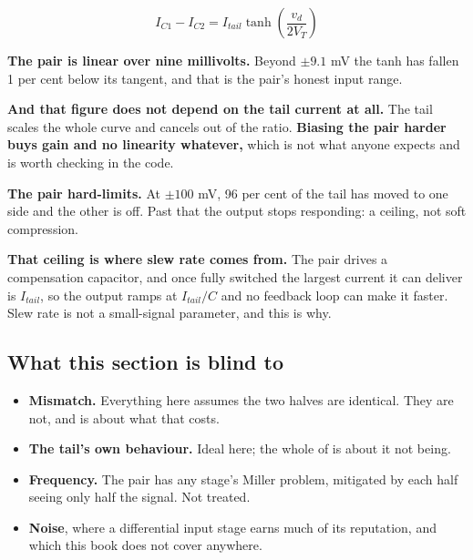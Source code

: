 \[
  I_{C1} - I_{C2} = I_{tail}\tanh\!\left(\frac{v_d}{2 V_T}\right)
\]


\textbf{The pair is linear over nine millivolts.} Beyond $\pm 9.1$ mV the tanh has fallen 1 per cent below its tangent, and that is the pair's honest input range.

\textbf{And that figure does not depend on the tail current at all.} The tail scales the whole curve and cancels out of the ratio. \textbf{Biasing the pair harder buys gain and no linearity whatever,} which is not what anyone expects and is worth checking in the code.

\textbf{The pair hard-limits.} At $\pm 100$ mV, 96 per cent of the tail has moved to one side and the other is off. Past that the output stops responding: a ceiling, not soft compression.

\textbf{That ceiling is where slew rate comes from.} The pair drives a compensation capacitor, and once fully switched the largest current it can deliver is $I_{tail}$, so the output ramps at $I_{tail}/C$ and no feedback loop can make it faster. Slew rate is not a small-signal parameter, and this is why.

\subsection{What this section is blind to}
\label{c9:sec:a5}
\begin{itemize}
  \item \textbf{Mismatch.} Everything here assumes the two halves are identical. They are not, and  is about what that costs.
  \item \textbf{The tail's own behaviour.} Ideal here; the whole of  is about it not being.
  \item \textbf{Frequency.} The pair has any stage's Miller problem, mitigated by each half seeing only half the signal. Not treated.
  \item \textbf{Noise}, where a differential input stage earns much of its reputation, and which this book does not cover anywhere.
\end{itemize}
